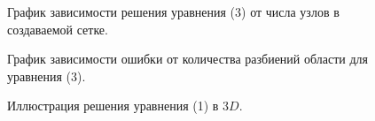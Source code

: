 \documentclass[a4paper,12pt]{article}
\theoremstyle{plain} %
\theoremstyle{definition} %
\theoremstyle{remark} %
\theoremstyle{definition}
\theoremstyle{definition}
\begin{document}
\begin{figure}[H]
\begin{minipage}[h]{0.47\linewidth}
				\end{minipage}
				\hfill
				\begin{minipage}[h]{0.47\linewidth}
				\end{minipage}
				\caption{График зависимости решения уравнения (3) от числа узлов в создаваемой сетке.}
				\label{ris:func_3_res}
			\end{figure}
		
		\begin{figure}[H]
			\caption{График зависимости ошибки от количества разбиений области для уравнения (3).}
		\end{figure}
		
		
		\begin{figure}[H]
			\caption{Иллюстрация решения уравнения (1) в $\textit{3D}$.}
		\end{figure}
		 
\end{document}
